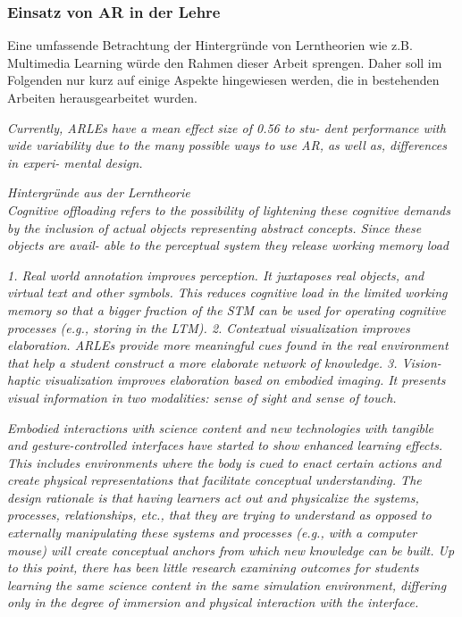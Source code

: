 \subsubsection{Einsatz von AR in der Lehre}
Eine umfassende Betrachtung der Hintergründe von Lerntheorien wie z.B. Multimedia Learning würde den Rahmen dieser Arbeit sprengen. Daher soll im Folgenden nur kurz auf einige Aspekte hingewiesen werden, die in bestehenden Arbeiten herausgearbeitet wurden. 

\textit{Currently, ARLEs have a mean effect size of 0.56 to stu- dent performance with wide variability due to the many possible ways to use AR, as well as, differences in experi- mental design.} \cite{Santos14}

\vspace{4px}
\textit{Hintergründe aus der Lerntheorie}\\
\textit{Cognitive offloading refers to the possibility of lightening these cognitive demands by the inclusion of actual objects representing abstract concepts. Since these objects are avail- able to the perceptual system they release working memory load} \cite{Marichal17}

\textit{1. Real world annotation improves perception. It juxtaposes real objects, and virtual text and other symbols. This reduces cognitive load in the limited working memory so that a bigger fraction of the STM can be used for operating cognitive processes (e.g., storing in the LTM).
2. Contextual visualization improves elaboration. ARLEs provide more meaningful cues found in the real environment that help a student construct a more elaborate network of knowledge.
3.
Vision-haptic visualization improves elaboration based on embodied imaging. It presents visual information in two modalities: sense of sight and sense of touch.} \cite{Santos14}

\textit{Embodied interactions with science content and new technologies with tangible and gesture-controlled interfaces have started to show enhanced learning effects. This includes environments where the body is cued to enact certain actions and create physical representations that facilitate conceptual understanding. The design rationale is that having learners act out and physicalize the systems, processes, relationships, etc., that they are trying to understand as opposed to externally manipulating these systems and processes (e.g., with a computer mouse) will create conceptual anchors from which new knowledge can be built. Up to this point, there has been little research examining outcomes for students learning the same science content in the same simulation environment, differing only in the degree of immersion and physical interaction with the interface.} \cite{Li11}


